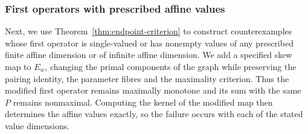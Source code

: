 \documentclass[11pt]{article}
\theoremstyle{definition}
\theoremstyle{remark}
\begin{document}
\subsubsection{First operators with prescribed affine values}
\label{subsec:affine-value-families}

Next, we use Theorem~\ref{thm:endpoint-criterion} to construct counterexamples whose first operator is single-valued or has nonempty values of any prescribed finite affine dimension or of infinite affine dimension. We add a specified skew map to $E_w$, changing the primal components of the graph while preserving the pairing identity, the parameter fibres and the maximality criterion. Thus the modified first operator remains maximally monotone and its sum with the same $P$ remains nonmaximal. Computing the kernel of the modified map then determines the affine values exactly, so the failure occurs with each of the stated value dimensions.
\end{document}
